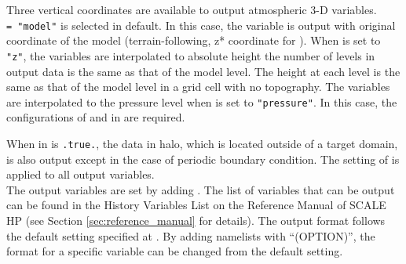 Three vertical coordinates are available to output atmospheric 3-D variables.\\
 \verb|= "model"| is selected in default.
In this case, the variable is output with original coordinate of the model (terrain-following, z* coordinate for \scalerm).
When  is set to \verb|"z"|, the variables are interpolated to absolute height
the number of levels in output data is the same as that of the model level.
The height at each level is the same as that of the model level in a grid cell with no topography.
The variables are interpolated to the pressure level when  is set to \verb|"pressure"|.
In this case, the configurations of  and  in  are required.

When  in  is \verb|.true.|,
the data in halo, which is located outside of a target domain, is also output except in the case of periodic boundary condition.
The setting of  is applied to all output variables.\\

The output variables are set by adding .
The list of variables that can be output can be found in the History Variables List on the Reference Manual of SCALE HP (see Section \ref{sec:reference_manual} for details).
The output format follows the default setting specified at .
By adding namelists with ``(OPTION)'', the format for a specific variable can be changed from the default setting.


